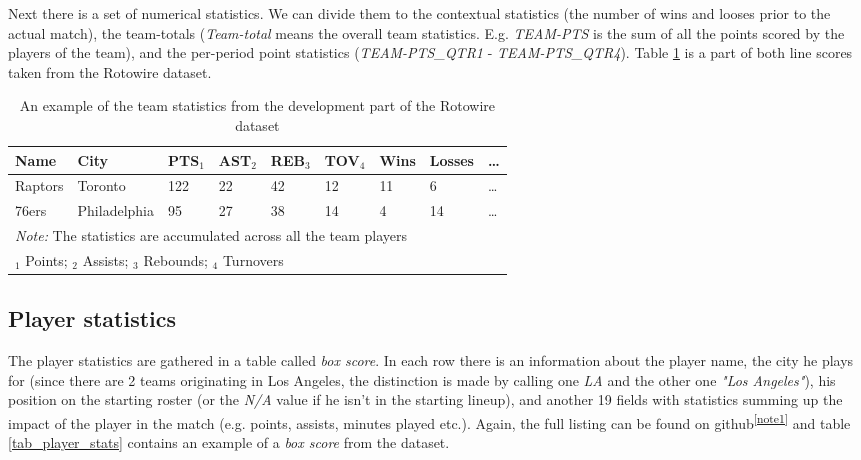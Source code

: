 Next there is a set of numerical statistics. We can divide them to the contextual statistics (the number of wins and looses prior to the actual match), the team-totals (\emph{Team-total} means the overall team statistics. E.g. \emph{TEAM-PTS} is the sum of all the points scored by the players of the team), and the per-period point statistics (\emph{TEAM-PTS\_QTR1} - \emph{TEAM-PTS\_QTR4}). Table \ref{tab_team_stats} is a part of both line scores taken from the Rotowire dataset.

\begin{table}[bh!]
    \centering
    \begin{tabular}{lllllllll}
        \toprule
        Name    & City         & PTS$_1$ & AST$_2$ & REB$_3$ & TOV$_4$ & Wins & Losses  &\dots \\
        \midrule
        Raptors & Toronto      & 122 & 22  & 42  & 12  & 11   & 6       &\dots \\
        76ers   & Philadelphia & 95  & 27  & 38  & 14  & 4    & 14     &\dots \\
        \bottomrule
        \multicolumn{9}{l}{\footnotesize \textit{Note:} The statistics are accumulated across all the team players} \\
        \multicolumn{9}{l}{\footnotesize $_1$ Points; $_2$ Assists; $_3$ Rebounds; $_4$ Turnovers}    \end{tabular}
    \caption{\centering An example of the team statistics from the development part of the Rotowire dataset} \label{tab_team_stats}
\end{table}

\subsection{Player statistics}

The player statistics are gathered in a table called \emph{box score}. In each row there is an information about the player name, the city he plays for (since there are 2 teams originating in Los Angeles, the distinction is made by calling one \emph{LA} and the other one \emph{"Los Angeles"}), his position on the starting roster (or the \emph{N/A} value if he isn't in the starting lineup), and another 19 fields with statistics summing up the impact of the player in the match (e.g. points, assists, minutes played etc.). Again, the full listing can be found on github\textsuperscript{\ref{note1}} and table \ref{tab_player_stats} contains an example of a \emph{box score} from the dataset.


